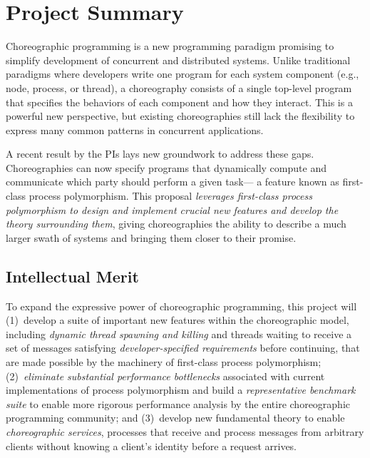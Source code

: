 



\section*{Project Summary}

Choreographic programming is a new programming paradigm promising to simplify development of concurrent and distributed systems.
Unlike traditional paradigms where developers write one program for each system component (e.g., node, process, or thread),
a choreography consists of a single top-level program that specifies the behaviors of each component and how they interact.
This is a powerful new perspective, but existing choreographies still lack the flexibility to express many common patterns in concurrent applications.

A recent result by the PIs lays new groundwork to address these gaps.
Choreographies can now specify programs that dynamically compute and communicate which party should perform a given task---%
a feature known as first-class process polymorphism.
This proposal \emph{leverages first-class process polymorphism to design and implement crucial new features and develop the theory surrounding them},
giving choreographies the ability to describe a much larger swath of systems and bringing them closer to their promise.

\subsection*{Intellectual Merit}

To expand the expressive power of choreographic programming, this project will
(1)~develop a suite of important new features within the choreographic model,
including \emph{dynamic thread spawning and killing}
and threads waiting to receive a set of messages satisfying \emph{developer-specified requirements} before continuing,
that are made possible by the machinery of first-class process polymorphism;
(2)~\emph{eliminate substantial performance bottlenecks} associated with current implementations of process polymorphism
and build a \emph{representative benchmark suite} to enable more rigorous performance analysis by the entire choreographic programming community;
and (3)~develop new fundamental theory to enable \emph{choreographic services},
processes that receive and process messages from arbitrary clients without knowing a client's identity before a request arrives.

